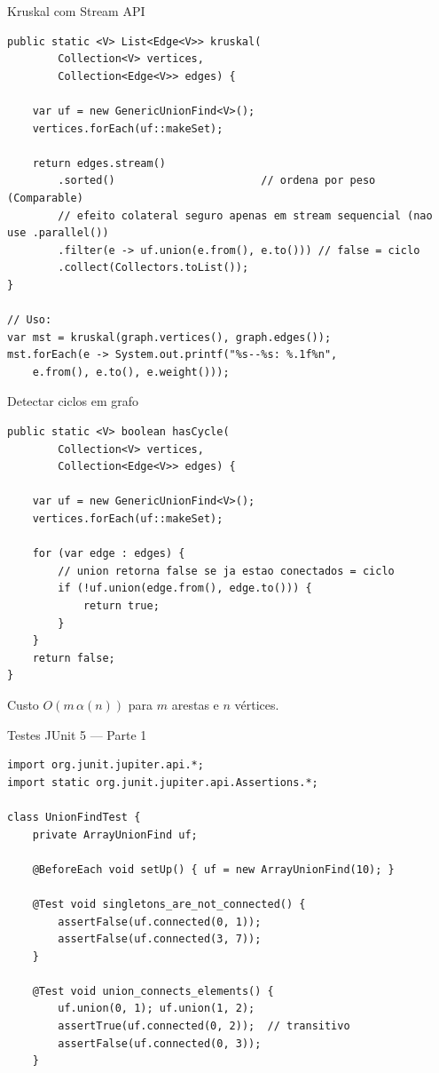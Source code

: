 \documentclass[aspectratio=169]{beamer}
\begin{document}
\begin{frame}[fragile,shrink=20]{Kruskal com Stream API}%
\begin{lstlisting}
public static <V> List<Edge<V>> kruskal(
        Collection<V> vertices,
        Collection<Edge<V>> edges) {

    var uf = new GenericUnionFind<V>();
    vertices.forEach(uf::makeSet);

    return edges.stream()
        .sorted()                       // ordena por peso (Comparable)
        // efeito colateral seguro apenas em stream sequencial (nao use .parallel())
        .filter(e -> uf.union(e.from(), e.to())) // false = ciclo
        .collect(Collectors.toList());
}

// Uso:
var mst = kruskal(graph.vertices(), graph.edges());
mst.forEach(e -> System.out.printf("%s--%s: %.1f%n",
    e.from(), e.to(), e.weight()));
\end{lstlisting}
\end{frame}

\begin{frame}[fragile,shrink=15]{Detectar ciclos em grafo}%
\begin{lstlisting}
public static <V> boolean hasCycle(
        Collection<V> vertices,
        Collection<Edge<V>> edges) {

    var uf = new GenericUnionFind<V>();
    vertices.forEach(uf::makeSet);

    for (var edge : edges) {
        // union retorna false se ja estao conectados = ciclo
        if (!uf.union(edge.from(), edge.to())) {
            return true;
        }
    }
    return false;
}
\end{lstlisting}
\vspace{0.2cm}
\begin{block}{Custo}
  $O(m\,\alpha(n))$ para $m$ arestas e $n$ vértices.
\end{block}
\end{frame}

\begin{frame}[fragile,shrink=5]{Testes JUnit 5 — Parte 1}%
\begin{lstlisting}
import org.junit.jupiter.api.*;
import static org.junit.jupiter.api.Assertions.*;

class UnionFindTest {
    private ArrayUnionFind uf;

    @BeforeEach void setUp() { uf = new ArrayUnionFind(10); }

    @Test void singletons_are_not_connected() {
        assertFalse(uf.connected(0, 1));
        assertFalse(uf.connected(3, 7));
    }

    @Test void union_connects_elements() {
        uf.union(0, 1); uf.union(1, 2);
        assertTrue(uf.connected(0, 2));  // transitivo
        assertFalse(uf.connected(0, 3));
    }
\end{lstlisting}
\end{frame}
\end{document}

